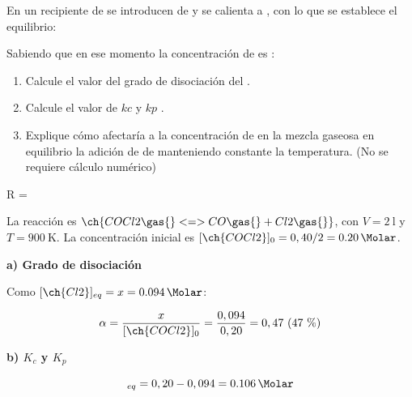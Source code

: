 \begin{exerciseEVAU}
    En un recipiente de  se introducen  de  y se calienta a , con lo que se establece el equilibrio:
    \begin{center}
    \end{center}
    Sabiendo que en ese momento la concentración de  es :
    \begin{enumerate}[label=\letraminuscula]
        \item Calcule el valor del grado de disociación del .
        \item Calcule el valor de \(kc\)  y \(kp\) .
        \item Explique cómo afectaría a la concentración de  en la mezcla gaseosa en equilibrio la adición de  de  manteniendo constante la temperatura.
        (No se requiere cálculo numérico)
    \end{enumerate}
    \datos{} R = \ctegases{}


    \begin{solu}

        La reacción es \(\ch{COCl2 \gas{} <=> CO \gas{} + Cl2 \gas{}}\), con \(V = \SI{2}{\litre}\) y \(T = \SI{900}{\kelvin}\). La concentración inicial es \([\ch{COCl2}]_0 = 0,40/2 = \SI{0.20}{\Molar}\).

        \textbf{a) Grado de disociación}

        Como \([\ch{Cl2}]_{eq} = x = \SI{0.094}{\Molar}\):

        \begin{equation*}
            \alpha = \dfrac{x}{[\ch{COCl2}]_0} = \dfrac{0,094}{0,20} = 0,47 \ (47\ \%)
        \end{equation*}

        \textbf{b) \(K_c\) y \(K_p\)}

        \begin{equation*}
            [\ch{COCl2}]_{eq} = 0,20 - 0,094 = \SI{0.106}{\Molar}
        \end{equation*}


\end{solu}
\end{exerciseEVAU}

